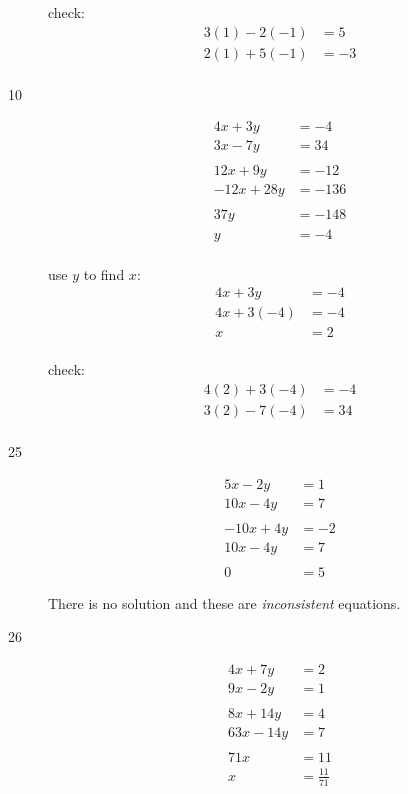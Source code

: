 \documentclass[fleqn,addpoints]{exam}
\begin{document}
\begin{description}
\vspace{0.2 cm}
\vspace{0.2 cm}

check:
\begin{align*}
  3(1) - 2(-1) &= 5 \\
  2(1)+5(-1) &= -3 \\
\end{align*}

\item[10]
\begin{align*}
  4x+3y &= -4 \\
  3x-7y &= 34 \\
  \\
  12x + 9y &= -12 \\
  -12x + 28y &= -136 \\
  \\
  37y &= -148 \\
  y &= -4 \\
\end{align*}

use $y$ to find $x$:
\begin{align*}
  4x+3y &= -4 \\
  4x+3(-4) &= -4 \\
  x &= 2 \\
\end{align*}

\vspace{0.2 cm}
\vspace{0.2 cm}

check:
\begin{align*}
  4(2)+3(-4) &= -4 \\
  3(2)-7(-4) &= 34 \\
\end{align*}

\item[25]
\begin{align*}
  5x-2y &= 1 \\
  10x - 4y &= 7 \\
  \\
  -10x + 4y &= -2 \\
  10x - 4y &= 7 \\
  \\
  0 &= 5
\end{align*}

There is no solution and these are {\em inconsistent} equations.

\item[26]
\begin{align*}
  4x+7y &= 2 \\
  9x - 2y &= 1 \\
  \\
  8x+14y &= 4 \\
  63x - 14y &= 7 \\
  \\
  71x &= 11 \\
  x &= \frac{11}{71}
\end{align*}


\end{description}
\end{document}
